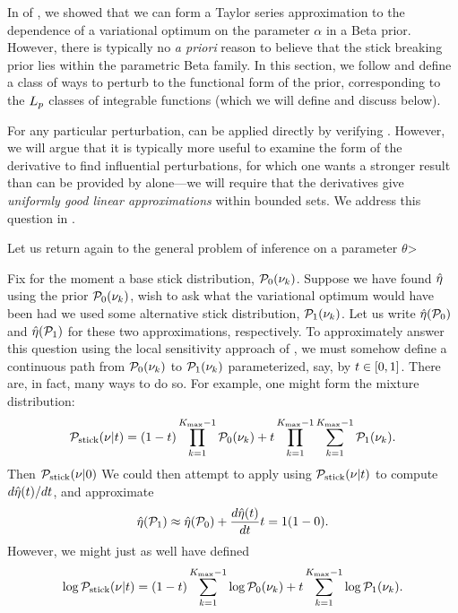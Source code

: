 In  of , we showed that
we can form a Taylor series approximation to the dependence of a variational
optimum on the parameter $\alpha$ in a Beta prior. However, there is typically
no {\em a priori} reason to believe that the stick breaking prior lies within
the parametric Beta family.  In this section, we follow
\citet{gustafson:1996:local} and define a class of ways to perturb to the
functional form of the prior, corresponding to the ${L_{p}}$ classes of
integrable functions (which we will define and discuss below).

For any particular perturbation,  can be applied directly by
verifying .  However, we will argue that it is
typically more useful to examine the form of the derivative to find influential
perturbations, for which one wants a stronger result than can be provided
by  alone---we will require that the derivatives give
{\em uniformly good linear approximations} within bounded sets.
We address this question in .

Let us return again to the general problem of inference on a parameter
$\theta$>

Fix for the moment a base stick distribution, $\mathcal{P}_{0}(\nu_{k})$.  Suppose we have
found $\hat\eta$ using the prior $\mathcal{P}_{0}(\nu_{k})$, wish to ask what the variational
optimum would have been had we used some alternative stick distribution,
$\mathcal{P}_{1}(\nu_{k})$.  Let us write $\hat\eta(\mathcal{P}_{0})$ and $\hat\eta(\mathcal{P}_{1})$ for these
two approximations, respectively.  To approximately answer this question using
the local sensitivity approach of , we must somehow
define a continuous path from $\mathcal{P}_{0}(\nu_{k})$ to $\mathcal{P}_{1}(\nu_{k})$ parameterized,
say, by $t \in [0, 1]$.  There are, in fact, many ways to do so.  For example,
one might form the mixture distribution:
%
\begin{align*}
%
\pstick(\nu \vert \t) =
    (1- \t) \prod_{k=1}^{\kmax - 1} \pbase(\nuk) +
    \t \prod_{k=1}^{\kmax - 1} \sumkm \palt(\nuk).
%
\end{align*}
%
Then $\mathcal{P}_{\mathrm{stick}}(\nu \vert 0)$
We could then attempt to apply  using $\mathcal{P}_{\mathrm{stick}}(\nu \vert t)$
to compute $d\hat\eta(t) / dt$, and approximate
%
\begin{align*}
%
\etaopt(\palt) \approx \etaopt(\pbase) + \frac{d \etaopt(\t)}{d\t}{\t=1}(1 - 0).
%
\end{align*}
%
However, we might just as well have defined
%
\begin{align*}
%
\log\pstick(\nu \vert \t) =
    (1- \t) \sumkm \log\pbase(\nuk) + \t \sumkm \log\palt(\nuk).
%
\end{align*}
%
